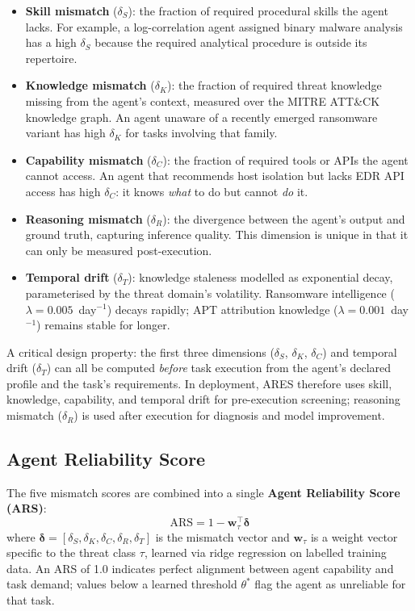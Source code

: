 \documentclass[journal,compsoc]{IEEEtran}
\newcommand{\ARES}{\textsc{ARES}}
\begin{document}
\begin{itemize}[noitemsep, leftmargin=*]
  \item \textbf{Skill mismatch} ($\delta_S$): the fraction of required
    procedural skills the agent lacks. For example, a log-correlation agent
    assigned binary malware analysis has a high $\delta_S$ because the
    required analytical procedure is outside its repertoire.
  \item \textbf{Knowledge mismatch} ($\delta_K$): the fraction of required
    threat knowledge missing from the agent's context, measured over the
    MITRE ATT\&CK~\cite{strom2022} knowledge graph. An agent unaware of a
    recently emerged ransomware variant has high $\delta_K$ for tasks
    involving that family.
  \item \textbf{Capability mismatch} ($\delta_C$): the fraction of
    required tools or APIs the agent cannot access. An agent that recommends
    host isolation but lacks EDR API access has high $\delta_C$: it knows
    \textit{what} to do but cannot \textit{do} it.
  \item \textbf{Reasoning mismatch} ($\delta_R$): the divergence between
    the agent's output and ground truth, capturing inference quality. This
    dimension is unique in that it can only be measured post-execution.
  \item \textbf{Temporal drift} ($\delta_T$): knowledge staleness modelled
    as exponential decay, parameterised by the threat domain's volatility.
    Ransomware intelligence ($\lambda = 0.005$~day$^{-1}$) decays rapidly;
    APT attribution knowledge ($\lambda = 0.001$~day$^{-1}$) remains stable
    for longer.
\end{itemize}

A critical design property: the first three dimensions ($\delta_S$,
$\delta_K$, $\delta_C$) and temporal drift ($\delta_T$) can all be computed
\textit{before} task execution from the agent's declared profile and the
task's requirements. In deployment, \ARES{} therefore uses skill,
knowledge, capability, and temporal drift for pre-execution
screening; reasoning mismatch ($\delta_R$) is used after execution
for diagnosis and model improvement.

\subsection{Agent Reliability Score}

The five mismatch scores are combined into a single
\textbf{Agent Reliability Score (ARS)}:
\[
  \mathrm{ARS} = 1 - \mathbf{w}_\tau^\top \boldsymbol{\delta}
\]
where $\boldsymbol{\delta} = [\delta_S, \delta_K, \delta_C, \delta_R,
\delta_T]$ is the mismatch vector and $\mathbf{w}_\tau$ is a weight vector
specific to the threat class $\tau$, learned via ridge regression on labelled
training data. An ARS of 1.0 indicates perfect alignment between agent
capability and task demand; values below a learned threshold $\theta^*$
flag the agent as unreliable for that task.
\end{document}

